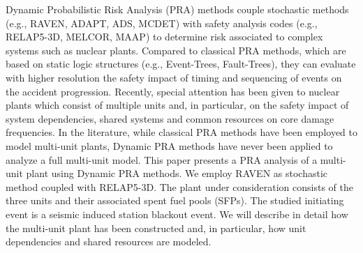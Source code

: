 Dynamic Probabilistic Risk Analysis (PRA) methods couple stochastic methods (e.g., RAVEN, ADAPT, ADS, MCDET) with safety analysis codes (e.g., RELAP5-3D, MELCOR, MAAP) to determine risk associated to complex systems such as nuclear plants. Compared to classical PRA methods, which are based on static logic structures (e.g., Event-Trees, Fault-Trees), they can evaluate with higher resolution the safety impact of timing and sequencing of events on the accident progression. Recently, special attention has been given to nuclear plants which consist of multiple units and, in particular, on the safety impact of system dependencies, shared systems and common resources on core damage frequencies. In the literature, while classical PRA methods have been employed to model multi-unit plants, Dynamic PRA methods have never been applied to analyze a full multi-unit model. This paper presents a PRA analysis of a multi-unit plant using Dynamic PRA methods. We employ RAVEN as stochastic method coupled with RELAP5-3D. The plant under consideration consists of the three units and their associated spent fuel pools (SFPs). The studied initiating event is a seismic induced station blackout event. We will describe in detail how the multi-unit plant has been constructed and, in particular, how unit dependencies and shared resources are modeled.
